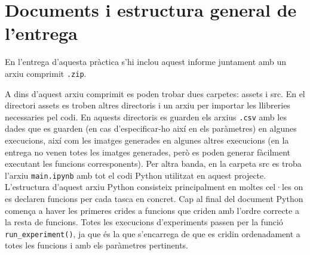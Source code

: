 \section{Documents i estructura general de l'entrega}
En l'entrega d'aquesta pràctica s'hi inclou aquest informe juntament amb un arxiu comprimit \texttt{.zip}. 

A dins d'aquest arxiu comprimit es poden trobar dues carpetes: assets i src. En el directori assets es troben altres directoris i un arxiu per importar les llibreries necessaries pel codi. En aquests directoris es guarden els arxius \texttt{.csv} amb les dades que es guarden (en cas d'especificar-ho així en els paràmetres) en algunes execucions, així com les imatges generades en algunes altres execucions (en la entrega no venen totes les imatges generades, però es poden generar fàcilment executant les funcions corresponents). Per altra banda, en la carpeta src es troba l'arxiu \texttt{main.ipynb} amb tot el codi Python utilitzat en aquest projecte. L'estructura d'aquest arxiu Python consisteix principalment en moltes cel·les on es declaren funcions per cada tasca en concret. Cap al final del document Python comença a haver les primeres crides a funcions que criden amb l'ordre correcte a la resta de funcions. Totes les execucions d'experiments passen per la funció \texttt{run\_experiment()}, ja que és la que s'encarrega de que es cridin ordenadament a totes les funcions i amb els paràmetres pertinents.